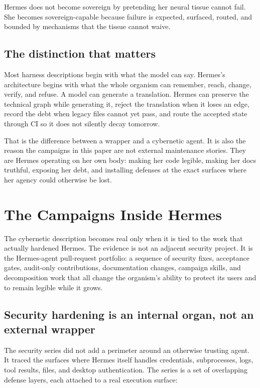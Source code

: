 \documentclass[11pt]{article}
\theoremstyle{definition}
\theoremstyle{plain}
\theoremstyle{remark}
\begin{document}
Hermes does not become sovereign by pretending her neural tissue cannot fail.
She becomes sovereign-capable because failure is expected, surfaced, routed,
and bounded by mechanisms that the tissue cannot waive.

\subsection{The distinction that matters}

Most harness descriptions begin with what the model can say. Hermes's
architecture begins with what the whole organism can remember, reach, change,
verify, and refuse. A model can generate a translation. Hermes can preserve
the technical graph while generating it, reject the translation when it loses
an edge, record the debt when legacy files cannot yet pass, and route the
accepted state through CI so it does not silently decay tomorrow.

That is the difference between a wrapper and a cybernetic agent. It is also
the reason the campaigns in this paper are not external maintenance stories.
They are Hermes operating on her own body: making her code legible, making her
docs truthful, exposing her debt, and installing defenses at the exact
surfaces where her agency could otherwise be lost.


\section{The Campaigns Inside Hermes}
\label{sec:hermes-campaigns}

The cybernetic description becomes real only when it is tied to the work that
actually hardened Hermes. The evidence is not an adjacent security project.
It is the Hermes-agent pull-request portfolio: a sequence of security fixes,
acceptance gates, audit-only contributions, documentation changes, campaign
skills, and decomposition work that all change the organism's ability to
protect its users and to remain legible while it grows.

\subsection{Security hardening is an internal organ, not an external wrapper}
\label{sec:hermes-security-series}

The security series did not add a perimeter around an otherwise trusting
agent. It traced the surfaces where Hermes itself handles credentials,
subprocesses, logs, tool results, files, and desktop authentication. The
series is a set of overlapping defense layers, each attached to a real
execution surface:
\end{document}
